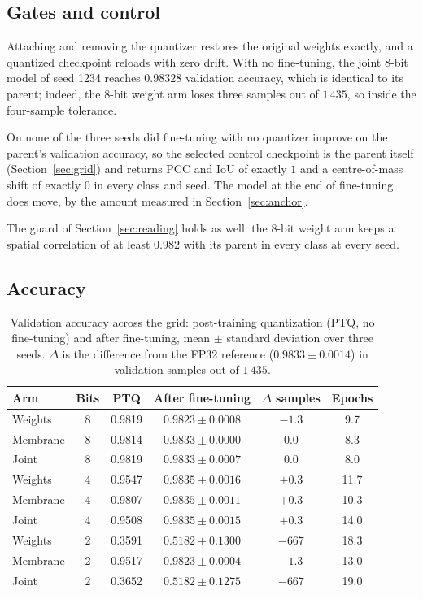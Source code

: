 \subsection{Gates and control}
\label{sec:grid-gates}

Attaching and removing the quantizer restores the original
weights exactly, and a quantized checkpoint reloads with zero drift. With no
fine-tuning, the joint 8-bit model of seed 1234 reaches $0.98328$ validation
accuracy, which is identical to its parent; indeed, the 8-bit weight arm loses three samples out
of $1\,435$, so inside the four-sample tolerance.

On none of the three seeds did fine-tuning with no quantizer improve on the
parent's validation accuracy, so the selected control checkpoint is the parent
itself (Section~\ref{sec:grid}) and returns PCC and IoU of exactly $1$ and a
centre-of-mass shift of exactly $0$ in every class and seed. The model at the end
of fine-tuning does move, by the amount measured in Section~\ref{sec:anchor}.

The guard of Section~\ref{sec:reading} holds as well: the 8-bit weight arm keeps
a spatial correlation of at least $0.982$ with its parent in every class at every
seed.

\subsection{Accuracy}

\begin{table}[htbp]
\centering
\begin{tabular}{lccccc}
\toprule
Arm & Bits & PTQ & After fine-tuning & $\Delta$ samples & Epochs \\
\midrule
Weights  & 8 & 0.9819 & $0.9823 \pm 0.0008$ & $-1.3$ & 9.7 \\
Membrane & 8 & 0.9814 & $0.9833 \pm 0.0000$ & $0.0$  & 8.3 \\
Joint    & 8 & 0.9819 & $0.9833 \pm 0.0007$ & $0.0$  & 8.0 \\
\midrule
Weights  & 4 & 0.9547 & $0.9835 \pm 0.0016$ & $+0.3$ & 11.7 \\
Membrane & 4 & 0.9807 & $0.9835 \pm 0.0011$ & $+0.3$ & 10.3 \\
Joint    & 4 & 0.9508 & $0.9835 \pm 0.0015$ & $+0.3$ & 14.0 \\
\midrule
Weights  & 2 & 0.3591 & $0.5182 \pm 0.1300$ & $-667$ & 18.3 \\
Membrane & 2 & 0.9517 & $\mathbf{0.9823 \pm 0.0004}$ & $-1.3$ & 13.0 \\
Joint    & 2 & 0.3652 & $0.5182 \pm 0.1275$ & $-667$ & 19.0 \\
\bottomrule
\end{tabular}
\caption{Validation accuracy across the grid: post-training quantization (PTQ,
no fine-tuning) and after fine-tuning, mean $\pm$ standard deviation over three
seeds. $\Delta$ is the difference from the FP32 reference
($0.9833 \pm 0.0014$) in validation samples out of $1\,435$.}
\label{tab:grid-accuracy}
\end{table}

